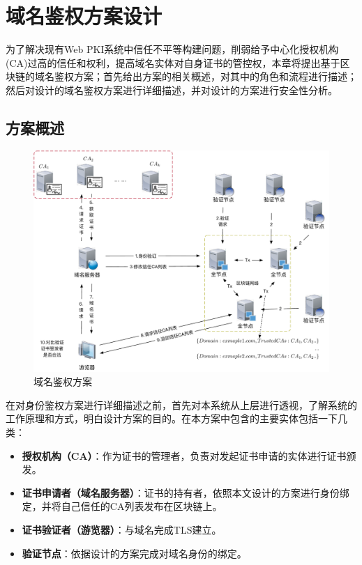 
\chapter{域名鉴权方案设计}

为了解决现有Web PKI系统中信任不平等构建问题，削弱给予中心化授权机构(CA)过高的信任和权利，提高域名实体对自身证书的管控权，本章将提出基于区块链的域名鉴权方案；首先给出方案的相关概述，对其中的角色和流程进行描述；然后对设计的域名鉴权方案进行详细描述，并对设计的方案进行安全性分析。



\section{方案概述}

\begin{figure}[!htbp]
 	\centering
 	\includegraphics[width = 1\textwidth]{img/arti}
 	\caption{域名鉴权方案}\label{fig:arti}
\end{figure}

在对身份鉴权方案进行详细描述之前，首先对本系统从上层进行透视，了解系统的工作原理和方式，明白设计方案的目的。在本方案中包含的主要实体包括一下几类：
\begin{itemize}
	\item \textbf{授权机构（CA）}：作为证书的管理者，负责对发起证书申请的实体进行证书颁发。
	\item \textbf{证书申请者（域名服务器）}：证书的持有者，依照本文设计的方案进行身份绑定，并将自己信任的CA列表发布在区块链上。
	\item \textbf{证书验证者（游览器）}：与域名完成TLS建立。
	\item \textbf{验证节点}：依据设计的方案完成对域名身份的绑定。
\end{itemize}



